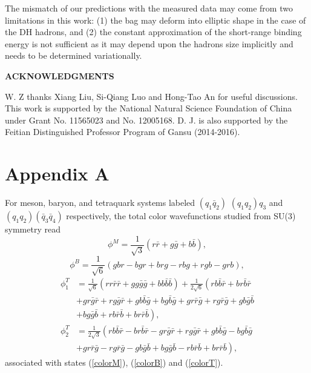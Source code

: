 \documentclass[12pt,onecolumn,floatfix,nofootinbib]{revtex4}
\begin{document}
The mismatch of our predictions with the measured data may come from two
limitations in this work: (1) the bag may deform into elliptic shape in the
case of the DH hadrons, and (2) the constant approximation of the
short-range binding energy is not sufficient as it may depend upon the
hadrons size implicitly and needs to be determined variationally.

\medskip \textbf{ACKNOWLEDGMENTS}

W. Z thanks Xiang Liu, Si-Qiang Luo and Hong-Tao An for useful discussions.
This work is supported by the National Natural Science Foundation of China
under Grant No. 11565023 and No. 12005168. D. J. is also supported by the
Feitian Distinguished Professor Program of Gansu (2014-2016).

\medskip

\section*{Appendix A}

\label{AppendixA} \setcounter{equation}{0} \renewcommand{\theequation}{A%
\arabic{equation}} For meson, baryon, and tetraquark systems labeled $(q_{1}%
\bar{q}_{2})$ $(q_{1}q_{2})q_{3}$ and $(q_{1}q_{2})(\bar{q}_{3}\bar{q}_{4})$
respectively, the total color wavefunctions studied from SU(3) symmetry read
\begin{equation}  \label{pcolorM}
\phi^{M}=\frac{1}{\sqrt{3}} \left(r\bar{r}+g\bar{g}+b\bar{b} \right),
\end{equation}
\begin{equation}  \label{pcolorB}
\phi^{B}=\frac{1}{\sqrt{6}} \left(gbr-bgr+brg-rbg+rgb-grb \right),
\end{equation}
\begin{equation}  \label{pcolorT}
\begin{aligned} \phi_{1}^{T}&=\frac{1}{\sqrt{6}}
\left(rr\bar{r}\bar{r}+gg\bar{g}\bar{g}+bb\bar{b}\bar{b} \right)
+\frac{1}{2\sqrt{6}} \left(rb\bar{b}\bar{r}+br\bar{b}\bar{r} \right.\\
&\left.
+gr\bar{g}\bar{r}+rg\bar{g}\bar{r}+gb\bar{b}\bar{g}+bg\bar{b}\bar{g}+gr%
\bar{r}\bar{g}+rg\bar{r}\bar{g}+gb\bar{g}\bar{b} \right.\\ &\left.
+bg\bar{g}\bar{b}+rb\bar{r}\bar{b}+br\bar{r}\bar{b} \right), \\
\phi_{2}^{T}&=\frac{1}{2\sqrt{3}}
\left(rb\bar{b}\bar{r}-br\bar{b}\bar{r}-gr\bar{g}\bar{r}+rg\bar{g}\bar{r}+gb%
\bar{b}\bar{g}-bg\bar{b}\bar{g} \right.\\ &\left.
+gr\bar{r}\bar{g}-rg\bar{r}\bar{g}-gb\bar{g}\bar{b}+bg\bar{g}\bar{b}-rb%
\bar{r}\bar{b}+br\bar{r}\bar{b}\right), \end{aligned}
\end{equation}
associated with states (\ref{colorM}), (\ref{colorB}) and (\ref{colorT}).
\end{document}
